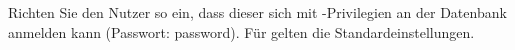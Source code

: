     \item Richten Sie den Nutzer  so ein, dass dieser sich mit -Privilegien an der Datenbank anmelden kann (Passwort: password). Für  gelten die Standard\-einstellungen.
